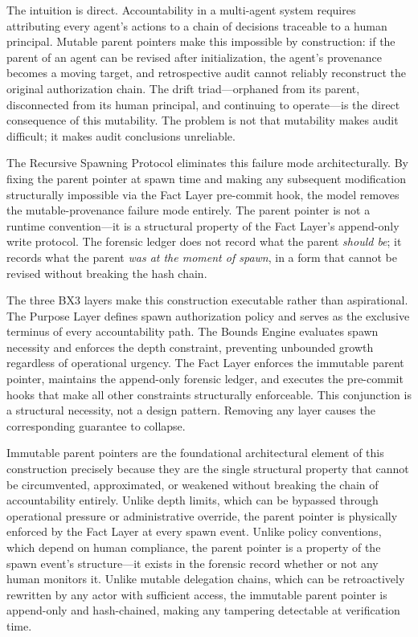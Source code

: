 The intuition is direct. Accountability in a multi-agent system requires attributing every agent's actions to a chain of decisions traceable to a human principal. Mutable parent pointers make this impossible by construction: if the parent of an agent can be revised after initialization, the agent's provenance becomes a moving target, and retrospective audit cannot reliably reconstruct the original authorization chain. The drift triad---orphaned from its parent, disconnected from its human principal, and continuing to operate---is the direct consequence of this mutability. The problem is not that mutability makes audit difficult; it makes audit conclusions unreliable.

The Recursive Spawning Protocol eliminates this failure mode architecturally. By fixing the parent pointer at spawn time and making any subsequent modification structurally impossible via the Fact Layer pre-commit hook, the model removes the mutable-provenance failure mode entirely. The parent pointer is not a runtime convention---it is a structural property of the Fact Layer's append-only write protocol. The forensic ledger does not record what the parent \textit{should be}; it records what the parent \textit{was at the moment of spawn}, in a form that cannot be revised without breaking the hash chain.

The three BX3 layers make this construction executable rather than aspirational. The Purpose Layer defines spawn authorization policy and serves as the exclusive terminus of every accountability path. The Bounds Engine evaluates spawn necessity and enforces the depth constraint, preventing unbounded growth regardless of operational urgency. The Fact Layer enforces the immutable parent pointer, maintains the append-only forensic ledger, and executes the pre-commit hooks that make all other constraints structurally enforceable. This conjunction is a structural necessity, not a design pattern. Removing any layer causes the corresponding guarantee to collapse.

Immutable parent pointers are the foundational architectural element of this construction precisely because they are the single structural property that cannot be circumvented, approximated, or weakened without breaking the chain of accountability entirely. Unlike depth limits, which can be bypassed through operational pressure or administrative override, the parent pointer is physically enforced by the Fact Layer at every spawn event. Unlike policy conventions, which depend on human compliance, the parent pointer is a property of the spawn event's structure---it exists in the forensic record whether or not any human monitors it. Unlike mutable delegation chains, which can be retroactively rewritten by any actor with sufficient access, the immutable parent pointer is append-only and hash-chained, making any tampering detectable at verification time.

